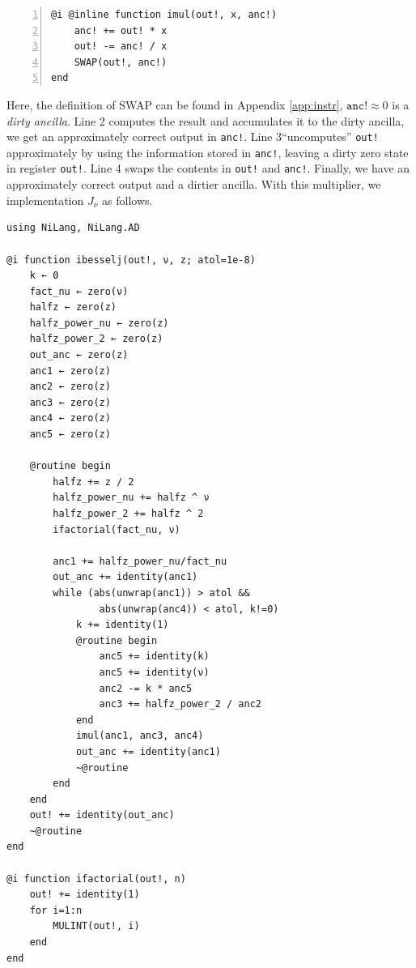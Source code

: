 \documentclass[aps,twocolumn,longbibliography,english,superscriptaddress]{revtex4-1}
\newcommand{\<}{\langle}
\renewcommand{\>}{\rangle}
\newcommand{\App}[1]{Appendix \ref{#1}}
\theoremstyle{definition}\newtheorem{definition}{\textit{Definition}}
\begin{document}
\begin{minipage}{.44\textwidth}
    \begin{lstlisting}[numberstyle=\scriptsize\color{gray},numbers=left,numbersep=8pt]
@i @inline function imul(out!, x, anc!)
    anc! += out! * x
    out! -= anc! / x
    SWAP(out!, anc!)
end
\end{lstlisting}
\end{minipage}

Here, the definition of SWAP can be found in \App{app:instr}, $\texttt{anc!} \approx 0$ is a \textit{dirty ancilla}.
Line 2 computes the result and accumulates it to the dirty ancilla, we get an approximately correct output in \texttt{anc!}.
Line 3``uncomputes'' \texttt{out!} approximately by using the information stored in \texttt{anc!}, leaving a dirty zero state in register \texttt{out!}.
Line 4 swaps the contents in \texttt{out!} and \texttt{anc!}.
Finally, we have an approximately correct output and a dirtier ancilla.
With this multiplier, we implementation $J_\nu$ as follows.

\begin{minipage}{.44\textwidth}
\begin{lstlisting}
using NiLang, NiLang.AD

@i function ibesselj(out!, ν, z; atol=1e-8)
    k ← 0
    fact_nu ← zero(ν)
    halfz ← zero(z)
    halfz_power_nu ← zero(z)
    halfz_power_2 ← zero(z)
    out_anc ← zero(z)
    anc1 ← zero(z)
    anc2 ← zero(z)
    anc3 ← zero(z)
    anc4 ← zero(z)
    anc5 ← zero(z)

    @routine begin
        halfz += z / 2
        halfz_power_nu += halfz ^ ν
        halfz_power_2 += halfz ^ 2
        ifactorial(fact_nu, ν)

        anc1 += halfz_power_nu/fact_nu
        out_anc += identity(anc1)
        while (abs(unwrap(anc1)) > atol &&
                abs(unwrap(anc4)) < atol, k!=0)
            k += identity(1)
            @routine begin
                anc5 += identity(k)
                anc5 += identity(ν)
                anc2 -= k * anc5
                anc3 += halfz_power_2 / anc2
            end
            imul(anc1, anc3, anc4)
            out_anc += identity(anc1)
            ~@routine
        end
    end
    out! += identity(out_anc)
    ~@routine
end

@i function ifactorial(out!, n)
    out! += identity(1)
    for i=1:n
        MULINT(out!, i)
    end
end
\end{lstlisting}
\end{minipage}
\end{document}
